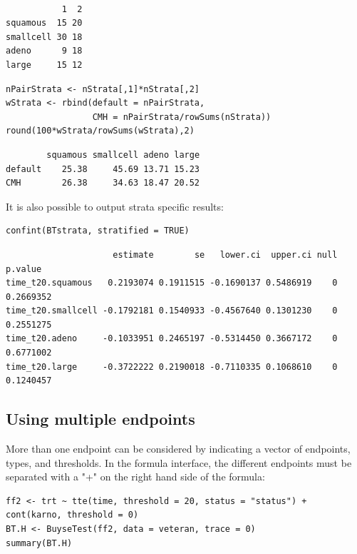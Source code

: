 \documentclass[12pt]{article}
\begin{document}
\begin{verbatim}

           1  2
squamous  15 20
smallcell 30 18
adeno      9 18
large     15 12
\end{verbatim}


\lstset{language=r,label= ,caption= ,captionpos=b,numbers=none}
\begin{lstlisting}
nPairStrata <- nStrata[,1]*nStrata[,2]
wStrata <- rbind(default = nPairStrata,
                 CMH = nPairStrata/rowSums(nStrata)) 
round(100*wStrata/rowSums(wStrata),2)
\end{lstlisting}

\begin{verbatim}
        squamous smallcell adeno large
default    25.38     45.69 13.71 15.23
CMH        26.38     34.63 18.47 20.52
\end{verbatim}


It is also possible to output strata specific results:
\lstset{language=r,label= ,caption= ,captionpos=b,numbers=none}
\begin{lstlisting}
confint(BTstrata, stratified = TRUE)
\end{lstlisting}

\begin{verbatim}
                     estimate        se   lower.ci  upper.ci null   p.value
time_t20.squamous   0.2193074 0.1911515 -0.1690137 0.5486919    0 0.2669352
time_t20.smallcell -0.1792181 0.1540933 -0.4567640 0.1301230    0 0.2551275
time_t20.adeno     -0.1033951 0.2465197 -0.5314450 0.3667172    0 0.6771002
time_t20.large     -0.3722222 0.2190018 -0.7110335 0.1068610    0 0.1240457
\end{verbatim}


\clearpage


\subsection{Using multiple endpoints}
\label{sec:orgfcef66f}
More than one endpoint can be considered by indicating a vector of
endpoints, types, and thresholds. In the formula interface, the
different endpoints must be separated with a "+" on the right hand
side of the formula:
\lstset{language=r,label= ,caption= ,captionpos=b,numbers=none}
\begin{lstlisting}
ff2 <- trt ~ tte(time, threshold = 20, status = "status") + cont(karno, threshold = 0)
BT.H <- BuyseTest(ff2, data = veteran, trace = 0)
summary(BT.H)
\end{lstlisting}
\end{document}
